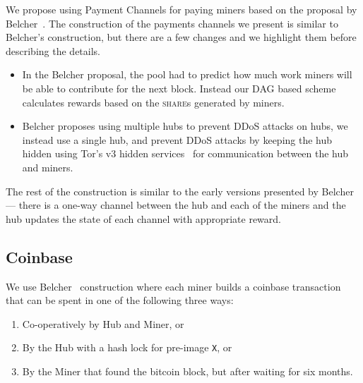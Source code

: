 \documentclass{article}
\begin{document}
We propose using Payment Channels for paying miners based on the
proposal by Belcher~\cite{channels-for-rewards}. The construction of
the payments channels we present is similar to Belcher's construction,
but there are a few changes and we highlight them before describing
the details.

\begin{itemize}
\item In the Belcher proposal, the pool had to predict how much work
  miners will be able to contribute for the next block. Instead our
  DAG based scheme calculates rewards based on the \textsc{share}s
  generated by miners.
\item Belcher proposes using multiple hubs to prevent DDoS attacks on
  hubs, we instead use a single hub, and prevent DDoS attacks by
  keeping the hub hidden using Tor's v3 hidden
  services~\cite{tor-design} for communication between the hub and
  miners.
\end{itemize}

The rest of the construction is similar to the early versions
presented by Belcher --- there is a one-way channel between the hub
and each of the miners and the hub updates the state of each channel
with appropriate reward.



\subsection{Coinbase}

We use Belcher~\cite{channels-for-rewards} construction where each
miner builds a coinbase transaction that can be spent in one of the
following three ways:

\begin{enumerate}
\item Co-operatively by Hub and Miner, or
\item By the Hub with a hash lock for pre-image \verb|X|, or
\item By the Miner that found the bitcoin block, but after waiting for
  six months.
\end{enumerate}
\end{document}
